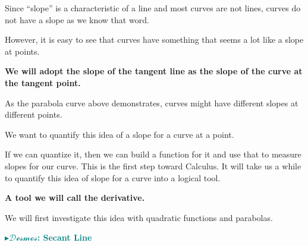 \documentclass{ximera}
\begin{document}
Since ``slope'' is a characteristic of a line and most curves are not lines, curves do not have a slope as we know that word. 

However, it is easy to see that curves have something that seems a lot like a slope at points. 


\begin{center}
\textbf{\textcolor{blue!55!black}{We will adopt the slope of the tangent line as the slope of the curve at the tangent point. }}  
\end{center}

As the parabola curve above demonstrates, curves might have different slopes at different points. 

We want to quantify this idea of a slope for a curve at a point. 

If we can quantize it, then we can build a function for it and use that to measure slopes for our curve. This is the first step toward Calculus. It will take us a while to quantify this idea of slope for a curve into a logical tool. 



\begin{center}
\textbf{\textcolor{blue!55!black}{A tool we will call the \textbf{derivative}.}}  
\end{center}



We will first investigate this idea with quadratic functions and parabolas. 








\begin{onlineOnly}
\textbf{\textcolor{teal}{$\blacktriangleright \mathcal{Desmos}$: Secant Line}} 
\begin{center}
\end{center}
\end{onlineOnly}
\end{document}
